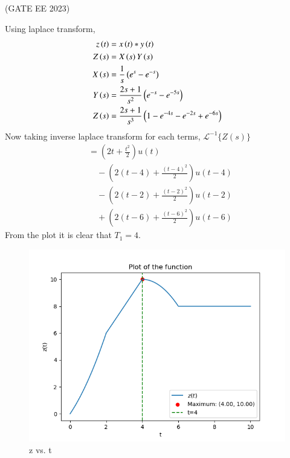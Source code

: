 \documentclass[a4,12pt,twocolumn]{IEEEtran}
\begin{document}


\hfill (GATE EE 2023)
\solution
\fi

Using laplace transform,
\begin{align}
z\left(t\right) &=x\left(t\right)*y\left(t\right)\label{eq:gate_ee_Q31.1} \\
Z\left(s\right) &=X\left(s\right)Y\left(s\right)\label{eq:gate_ee_Q31.2} \\
X\left(s\right) &= \frac{1}{s} \left(e^{s}-e^{-s}\right) \label{eq:gate_ee_Q31.3}\\
Y\left(s\right) &= \frac{2s+1}{s^2} \left(e^{-s}-e^{-5s}\right)\label{eq:gate_ee_Q31.4}\\
Z\left(s\right) &= \frac{2s+1}{s^3} \left(1-e^{-4s}-e^{-2s}+e^{-6s}\right)\label{eq:gate_ee_Q31.5}
\end{align}
Now taking inverse laplace transform for each terms, $\mathscr{L^{-1}} \{Z(s)\}$
\begin{align}
&= \left( 2t + \frac{t^2}{2} \right) u(t) \nonumber \\
&\quad - \left( 2(t-4) + \frac{(t-4)^2}{2} \right)u(t-4) \nonumber \\
&\quad - \left( 2(t-2) + \frac{(t-2)^2}{2} \right)u(t-2) \nonumber \\
&\quad + \left( 2(t-6) + \frac{(t-6)^2}{2} \right)u(t-6) \nonumber
\end{align}\label{eq:gate_ee_Q31.6}
From the plot it is clear that $T_1=4$.\\
\begin{figure}[h]
\centering
   \includegraphics[width=1\linewidth]{2023/EE/31/figs/figs/gate2023EE.png}
   \caption{z vs. t}
   \label{fig:gate2023EE1}
 \end{figure}\\
\end{document}
